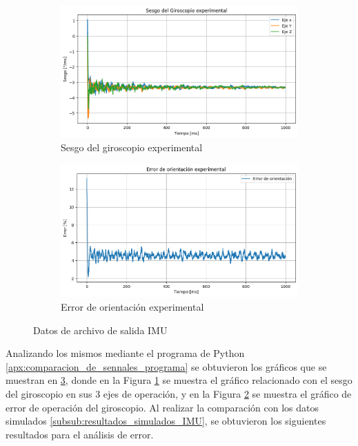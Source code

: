 \begin{figure}[htbp]
    \centering
    \begin{subfigure}[b]{0.35\textwidth}
        \centering
        \includegraphics[width=\textwidth]{fig/Capitulo5/Caso_de_estudio_IMU/data/experimental/sesgo_experimental.png}
        \caption{Sesgo del giroscopio experimental}
        \label{fig:imu_sesgo_exp}
    \end{subfigure}
    \hfill
    \begin{subfigure}[b]{0.45\textwidth}
        \centering
        \includegraphics[width=\textwidth]{fig/Capitulo5/Caso_de_estudio_IMU/data/experimental/error_de_orientacion.png}
        \caption{Error de orientación experimental}
        \label{fig:out_files_IMU_eo_exp}
    \end{subfigure}
    \caption{Datos de archivo de salida IMU}
    \label{fig:IMU_ZEDBOARD_exp}
\end{figure}

Analizando los mismos mediante el programa de Python \ref{apx:comparacion_de_sennales_programa} se obtuvieron los gráficos que se muestran en \ref{fig:IMU_ZEDBOARD_exp}, donde en la Figura \ref{fig:imu_sesgo_exp} se muestra el gráfico relacionado con el sesgo del giroscopio en sus 3 ejes de operación, y en la Figura \ref{fig:out_files_IMU_eo_exp} se muestra el gráfico de error de operación del giroscopio. Al realizar la comparación con los datos simulados \ref{subsub:resultados_simulados_IMU}, se obtuvieron los siguientes resultados para el análisis de error.

